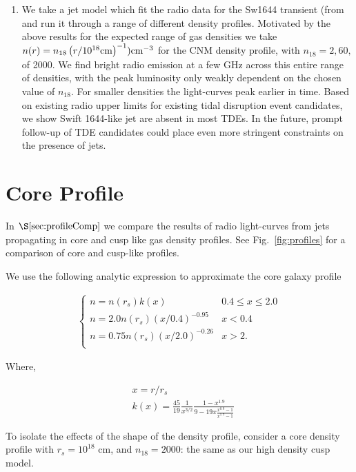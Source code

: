 \documentclass[usenatbib,fleqn]{mnras}
\begin{document}
\begin{enumerate}
\item We take a jet model which fit the radio data for the Sw1644
  transient (from \citealt{Mimica+2015} and run it through a range of
  different density profiles. Motivated by the above results for the
  expected range of gas densities we take $n(r)=n_{18} \left(r/10^{18}
    {\rm cm}\right)^{-1}) {\rm cm}^{-3}$ for the CNM density profile,
  with $n_{18}=2, 60,$ of 2000.  We find bright radio emission at a
  few GHz across this entire range of densities, with the peak
  luminosity only weakly dependent on the chosen value of $n_{18}$.
  For smaller densities the light-curves peak earlier in time. Based
  on existing radio upper limits for existing tidal disruption event
  candidates, we show Swift 1644-like jet are absent in most TDEs. In
  the future, prompt follow-up of TDE candidates could place even more
  stringent constraints on the presence of jets.
\end{enumerate}

\appendix
\section{Core Profile}
\label{app:core}
In $\S\ref{sec:profileComp}$ we compare the results of radio
light-curves from jets propagating in core and cusp like gas density
profiles. See Fig.~\ref{fig:profiles} for a comparison of core and
cusp-like profiles. 

We use the following analytic expression to approximate the core
galaxy profile

\begin{align}
\begin{cases}
n=n(r_s) k(x) & 0.4 \leq x\leq 2.0\\
n = 2.0 n(r_s) (x/0.4)^{-0.95} & x < 0.4\\
n = 0.75 n(r_s) (x/2.0)^{-0.26} & x>2.\\
\end{cases}
\label{eq:cores}
\end{align}

Where, 

\begin{align}
  &x=r/r_s\\\nonumber
  &k(x)=\frac{45}{19} \frac{1}{x^{3/2}} \frac{1-x^{1.9}}{9-19
      x\frac{x^{0.9}-1}{x^{1.9}-1}}
\end{align}

To isolate the effects of the shape of the density profile, consider a
core density profile with $r_s=10^{18}$ cm, and $n_{18}=2000$: the
same as our high density cusp model.

\clearpage
  \footnotesize{
    
    
  }
\end{document}
